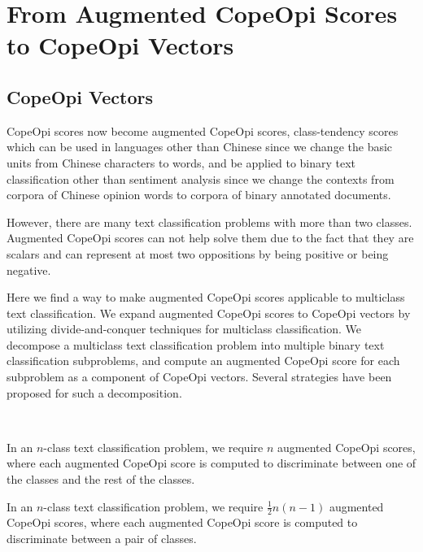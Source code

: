 \section{From Augmented CopeOpi Scores to CopeOpi Vectors}
\subsection{CopeOpi Vectors}
\par CopeOpi scores now become augmented CopeOpi scores, class-tendency scores which can be used in languages other than Chinese since we change the basic units from Chinese characters to words, and be applied to binary text classification other than sentiment analysis since we change the contexts from corpora of Chinese opinion words to corpora of binary annotated documents.
\par However, there are many text classification problems with more than two classes. Augmented CopeOpi scores can not help solve them due to the fact that they are scalars and can represent at most two oppositions by being positive or being negative.
\par Here we find a way to make augmented CopeOpi scores applicable to multiclass text classification. We expand augmented CopeOpi scores to CopeOpi vectors by utilizing divide-and-conquer techniques for multiclass classification. We decompose a multiclass text classification problem into multiple binary text classification subproblems, and compute an augmented CopeOpi score for each subproblem as a component of CopeOpi vectors. Several strategies have been proposed for such a decomposition\cite{aly2005multiclass}.

~\newline
~\newline
\clearpage
{}
\par In an $n$-class text classification problem, we require $n$ augmented CopeOpi scores,
where each augmented CopeOpi score is computed to discriminate between one of the classes and the rest of the classes.

\par In an $n$-class text classification problem, we require $\frac{1}{2}n(n-1)$ augmented CopeOpi scores,
where each augmented CopeOpi score is computed to discriminate between a pair of classes.


